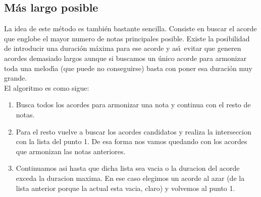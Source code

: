 \documentclass[a4paper]{report}
\begin{document}
\subsection{M\'as largo posible}
La idea de este m\'etodo es tambi\'en bastante sencilla. Consiste en 
buscar el acorde que englobe el mayor numero de notas principales
posible. Existe la posibilidad de introducir una duraci\'on m\'axima
para ese acorde y as\'\i ~evitar que generen acordes demasiado
largos aunque si buscamos un \'unico acorde para armonizar
toda una melod\'\i a (que puede no conseguirse) basta con poner esa
duraci\'on muy grande.\\
El algoritmo es como sigue:
\begin{enumerate}
\item Busca todos los acordes para armonizar una nota y continua
con el resto de notas.
\item Para el resto vuelve a buscar los acordes candidatos y 
realiza la interseccion con la lista del punto 1. De esa
forma nos vamos quedando con los acordes que armonizan las
notas anteriores.
\item Continuamos asi hasta que dicha lista sea vacia o la duracion
del acorde exceda la duracion maxima. En ese caso elegimos un 
acorde al azar (de la lista anterior porque la actual esta vacia, claro)
y volvemos al punto 1.
\end{enumerate}
\end{document}
